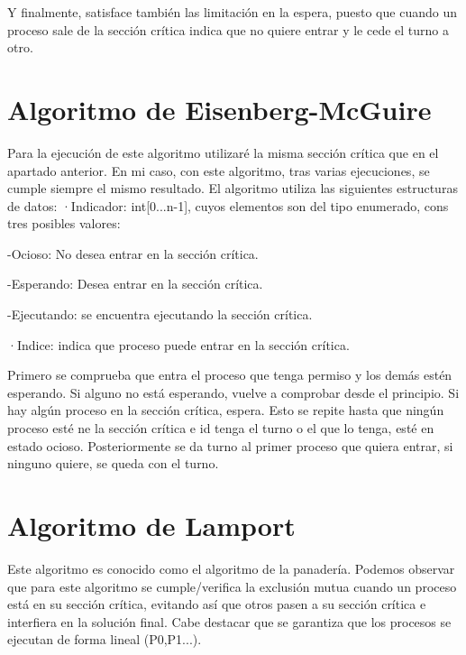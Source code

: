 \documentclass{article}
\begin{document}
Y finalmente, satisface también las limitación en la espera, puesto que cuando un proceso sale de la sección crítica indica que no quiere entrar y le cede el turno a otro.


\section{Algoritmo de Eisenberg-McGuire}
Para la ejecución de este algoritmo utilizaré la misma sección crítica que en el apartado anterior. En mi caso, con este algoritmo, tras varias ejecuciones, se cumple siempre el mismo resultado.
\hfill \break
El algoritmo utiliza las siguientes estructuras de datos:
\hfill \break
\hfill \break
·Indicador: int[0...n-1], cuyos elementos son del tipo enumerado, cons tres posibles valores:

-Ocioso: No desea entrar en la sección crítica.

-Esperando: Desea entrar en la sección crítica.

-Ejecutando: se encuentra ejecutando la sección crítica.

·Indice: indica que proceso puede entrar en la sección crítica.

\hfill \break
Primero se comprueba que entra el proceso que tenga permiso y los demás estén esperando. Si alguno no está esperando, vuelve a comprobar desde el principio. Si hay algún proceso en la sección crítica, espera. Esto se repite hasta que ningún proceso esté ne la sección crítica e id tenga el turno o el que lo tenga, esté en estado ocioso. Posteriormente se da turno al primer proceso que quiera entrar, si ninguno quiere, se queda con el turno.


\section{Algoritmo de Lamport}
Este algoritmo es conocido como el algoritmo de la panadería. 
Podemos observar que para este algoritmo se cumple/verifica la exclusión mutua cuando un proceso está en su sección crítica, evitando así que otros pasen a su sección crítica e interfiera en la solución final.
Cabe destacar que se garantiza que los procesos se ejecutan de forma lineal (P0,P1...).
\end{document}
